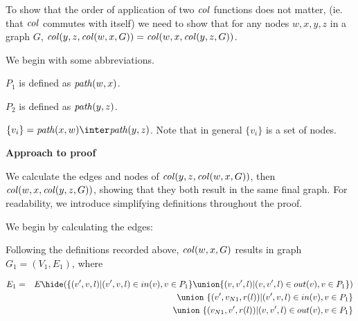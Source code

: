 To show that  the order of application of two $\mathit{col}$ functions does not matter, (ie. that $\mathit{col}$ commutes with itself)  we need to show that for any nodes $w,x,y,z$ in a graph $G$, $\mathit{col}(y,z,\mathit{col}(w,x,G)) = \mathit{col}(w,x,\mathit{col}(y,z,G))$. 


We begin with some abbreviations.

$P_1$ is defined as $\mathit{path}(w,x)$.

$P_2$ is defined as $\mathit{path}(y,z)$.

$\{v_i\} = \Path(x,w) \inter \Path(y,z)$. Note that in general $\{v_i\}$ is a set of nodes. 









{\bf Approach to proof}
\vspace{10pt}

We  calculate the edges and nodes of  $\mathit{col}(y,z,\mathit{col}(w,x,G))$,  then $\mathit{col}(w,x,\mathit{col}(y,z,G))$, showing that they both result in the same final graph. For readability, we introduce simplifying definitions throughout the proof. 


We begin by calculating the edges:

Following the definitions recorded above, $\mathit{col}(w,x,G)$ results in graph $G_1=(V_1,E_1)$, where

\begin{eqnarray*}
  E_1 & = & E\hide (
                   \{(v',v,l)|(v',v,l) \in in(v), v\in P_1\}
                   \union
                   \{(v,v',l)|(v,v',l) \in out(v), v\in P_1\}
                  )\\
  && \union\ \{(v',v_{N1},r(l))|(v',v,l) \in in(v), v\in P_1\}\\
  && \union\ \{(v_{N1},v',r(l))|(v,v',l) \in out(v), v\in P_1\}\\
\end{eqnarray*}

